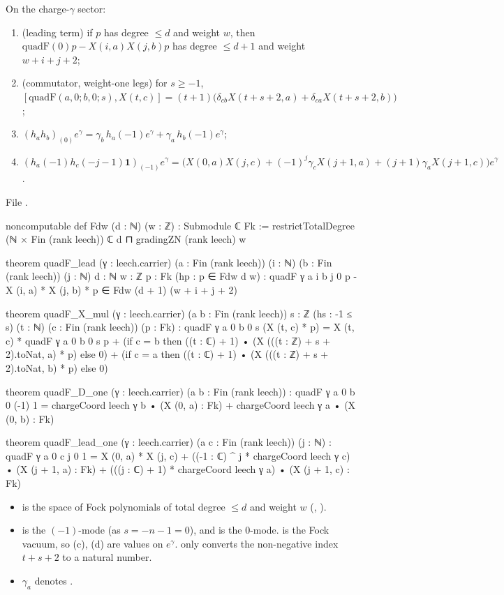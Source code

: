 \begin{theorem}\label{ch12:thm:quadfacts}
On the charge-$\gamma$ sector:
\begin{enumerate}[label=(\alph*)]
\item (leading term) if $p$ has degree $\le d$ and weight $w$, then
  $\mathrm{quadF}(0)p - X(i,a)X(j,b)p$ has degree $\le d+1$ and weight $w+i+j+2$;
\item (commutator, weight-one legs) for $s\ge-1$,
  $[\mathrm{quadF}(a,0;b,0;s),X(t,c)]=(t+1)\big(\delta_{cb}X(t+s+2,a)+\delta_{ca}X(t+s+2,b)\big)$;
\item $(h_ah_b)_{(0)}e^\gamma = \gamma_b\,h_a(-1)e^\gamma+\gamma_a\,h_b(-1)e^\gamma$;
\item $(h_a(-1)h_c(-j-1)\mathbf 1)_{(-1)}e^\gamma = \big(X(0,a)X(j,c)+(-1)^j\gamma_c X(j+1,a)+(j+1)\gamma_aX(j+1,c)\big)e^\gamma$.
\end{enumerate}
\end{theorem}
File .
\begin{leancode}
noncomputable def Fdw (d : ℕ) (w : ℤ) : Submodule ℂ Fk :=
  restrictTotalDegree (ℕ × Fin (rank leech)) ℂ d ⊓ gradingZN (rank leech) w

theorem quadF_lead (γ : leech.carrier) (a : Fin (rank leech)) (i : ℕ) (b : Fin (rank leech))
    (j : ℕ) {d : ℕ} {w : ℤ} {p : Fk} (hp : p ∈ Fdw d w) :
    quadF γ a i b j 0 p - X (i, a) * X (j, b) * p ∈ Fdw (d + 1) (w + i + j + 2)

theorem quadF_X_mul (γ : leech.carrier) (a b : Fin (rank leech)) {s : ℤ} (hs : -1 ≤ s) (t : ℕ)
    (c : Fin (rank leech)) (p : Fk) :
    quadF γ a 0 b 0 s (X (t, c) * p) = X (t, c) * quadF γ a 0 b 0 s p
      + (if c = b then ((t : ℂ) + 1) • (X (((t : ℤ) + s + 2).toNat, a) * p) else 0)
      + (if c = a then ((t : ℂ) + 1) • (X (((t : ℤ) + s + 2).toNat, b) * p) else 0)

theorem quadF_D_one (γ : leech.carrier) (a b : Fin (rank leech)) :
    quadF γ a 0 b 0 (-1) 1
      = chargeCoord leech γ b • (X (0, a) : Fk) + chargeCoord leech γ a • (X (0, b) : Fk)

theorem quadF_lead_one (γ : leech.carrier) (a c : Fin (rank leech)) (j : ℕ) :
    quadF γ a 0 c j 0 1
      = X (0, a) * X (j, c) + ((-1 : ℂ) ^ j * chargeCoord leech γ c) • (X (j + 1, a) : Fk)
        + (((j : ℂ) + 1) * chargeCoord leech γ a) • (X (j + 1, c) : Fk)
\end{leancode}
\begin{dictionary}
\begin{itemize}
\item {} is the space of Fock polynomials of total degree $\le d$ and weight $w$
  (, ).
\item {} is the $(-1)$-mode (as $s=-n-1=0$), and  is the $0$-mode.
   is the Fock vacuum, so (c), (d) are values on $e^\gamma$.   only converts
  the non-negative index $t+s+2$ to a natural number.
\item $\gamma_a$ denotes .
\end{itemize}
\end{dictionary}

